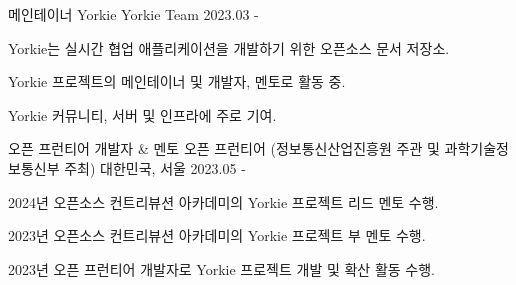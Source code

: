 

\begin{cventries}

  \cventry
    {메인테이너} %
    {Yorkie} %
    {Yorkie Team} %
    {2023.03 - } %
    {
      \begin{cvitems} %
        \item {Yorkie는 실시간 협업 애플리케이션을 개발하기 위한 오픈소스 문서 저장소.}
        \item {Yorkie 프로젝트의 메인테이너 및 개발자, 멘토로 활동 중.}
        \item {Yorkie 커뮤니티, 서버 및 인프라에 주로 기여.}
      \end{cvitems}
    }


\cventry
    {오픈 프런티어 개발자 \& 멘토} %
    {오픈 프런티어 (정보통신산업진흥원 주관 및 과학기술정보통신부 주최)} %
    {대한민국, 서울} %
    {2023.05 - } %
    {
      \begin{cvitems} %
        \item {2024년 오픈소스 컨트리뷰션 아카데미의 Yorkie 프로젝트 리드 멘토 수행.}
        \item {2023년 오픈소스 컨트리뷰션 아카데미의 Yorkie 프로젝트 부 멘토 수행.}
        \item {2023년 오픈 프런티어 개발자로 Yorkie 프로젝트 개발 및 확산 활동 수행.}
      \end{cvitems}
    }
    

\end{cventries}

